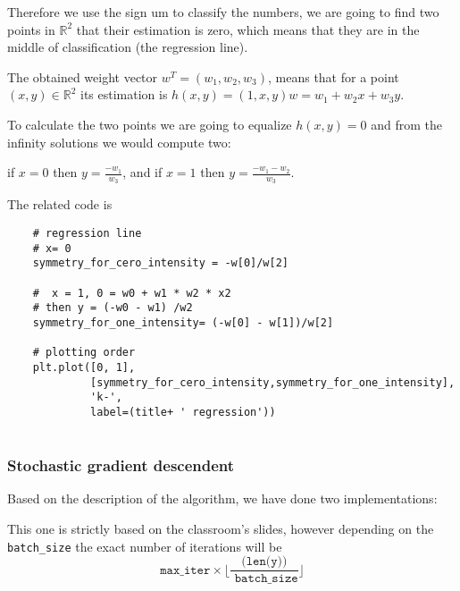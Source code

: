  Therefore we use the sign um to classify the numbers, we are going to find two points in $\mathbb R^2$ that their estimation is zero, which means that they are in the middle of classification (the regression line).

  The obtained weight vector $w^T = (w_1,w_2,w_3)$, means that for a point $(x,y) \in \mathbb R^2$
  its estimation is $h(x,y) = (1,x,y) w = w_1 + w_2x + w_3y$.

  To calculate the two points we are going to equalize $h(x,y)=0$ and from the infinity solutions we would compute two:

  if $x=0$ then $y = \frac{- w_1}{w_3}$, and if  $x=1$ then $y = \frac{- w_1 - w_2}{w_3}.$
  

  The related code is


  \begin{verbatim}
    # regression line
    # x= 0
    symmetry_for_cero_intensity = -w[0]/w[2]

    #  x = 1, 0 = w0 + w1 * w2 * x2
    # then y = (-w0 - w1) /w2
    symmetry_for_one_intensity= (-w[0] - w[1])/w[2]

    # plotting order
    plt.plot([0, 1],
             [symmetry_for_cero_intensity,symmetry_for_one_intensity],
             'k-',
             label=(title+ ' regression'))
     
  \end{verbatim}

  
  \subsubsection{Stochastic gradient descendent}

  Based on the description of the algorithm, we have done two implementations:

  This one is strictly based on the classroom's slides, however depending on the \texttt{batch\_size} the exact number of iterations will be
$$\texttt{max\_iter} \times \lfloor \frac{ \texttt{(len(y))}}{\texttt{ batch\_size}} \rfloor$$ 

